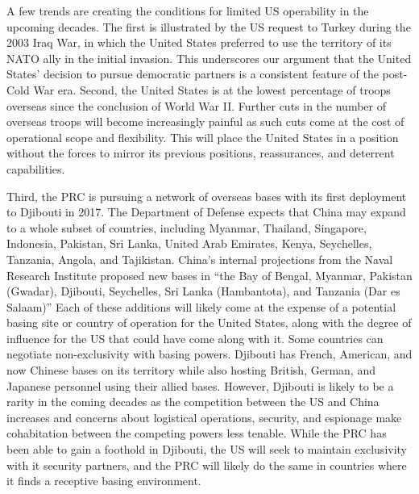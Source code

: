 A few trends are creating the conditions for limited US operability in the upcoming decades. The first is illustrated by the US request to Turkey during the 2003 Iraq War, in which the United States preferred to use the territory of its NATO ally in the initial invasion. This underscores our argument that the United States' decision to pursue democratic partners is a consistent feature of the post-Cold War era. Second, the United States is at the lowest percentage of troops overseas since the conclusion of World War II.\autocite{Huston1988,Warren2016,Allen2021a,Allen2021b} Further cuts in the number of overseas troops will become increasingly painful as such cuts come at the cost of operational scope and flexibility. This will place the United States in a position without the forces to mirror its previous positions, reassurances, and deterrent capabilities. 

Third, the PRC is pursuing a network of overseas bases with its first deployment to Djibouti in 2017. The Department of Defense expects that China may expand to a whole subset of countries, including Myanmar, Thailand, Singapore, Indonesia, Pakistan, Sri Lanka, United Arab Emirates, Kenya, Seychelles, Tanzania, Angola, and Tajikistan.\autocite{OSD2020} China's internal projections from the Naval Research Institute proposed new bases in ``the Bay of Bengal, Myanmar, Pakistan (Gwadar), Djibouti, Seychelles, Sri Lanka (Hambantota), and Tanzania (Dar es Salaam)''\cite[\ppno~207]{Doshi2021} Each of these additions will likely come at the expense of a potential basing site or country of operation for the United States, along with the degree of influence for the US that could have come along with it. Some countries can negotiate non-exclusivity with basing powers. Djibouti has French, American, and now Chinese bases on its territory while also hosting British, German, and Japanese personnel using their allied bases. However, Djibouti is likely to be a rarity in the coming decades as the competition between the US and China increases and concerns about logistical operations, security, and espionage make cohabitation between the competing powers less tenable. While the PRC has been able to gain a foothold in Djibouti, the US will seek to maintain exclusivity with it security partners, and the PRC will likely do the same in countries where it finds a receptive basing environment.

